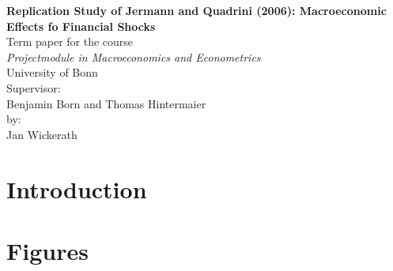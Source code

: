 \documentclass[a4paper,12pt,titlepage]{article}
\begin{document}
\begin{titlepage}
\begin{center}

\textbf{\Huge Replication Study of Jermann and Quadrini (2006): Macroeconomic
  Effects fo Financial Shocks}
\\[5cm]
\Large 
Term paper for the course\\
\textit{Projectmodule in Macroeconomics and Econometrics}\\
University of Bonn\\
\vfill
Supervisor: \\
Benjamin Born and Thomas Hintermaier\\[2cm]

by:\\
Jan Wickerath\\


\end{center}
\end{titlepage}

\thispagestyle{empty}

\newpage

\setcounter{page}{1}

\thispagestyle{empty}

\section{Introduction}
\label{sec:intro}



% 
% 
% 
% 
% 
\newpage

\appendix


\section{Figures}

\newpage
% 
% 
\end{document}
